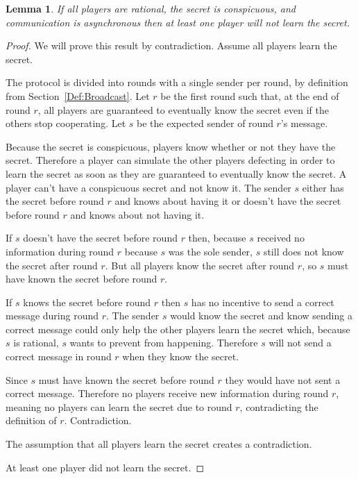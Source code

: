\documentclass{dalcsthesis}
\newtheorem{lemma}{Lemma}
\begin{document}
\begin{lemma}\label{Lem:Async:ConspicuousMustSacrifice}If all players are rational, the secret is conspicuous, and communication is asynchronous then at least one player will not learn the secret.\end{lemma}
\begin{proof}
We will prove this result by contradiction. Assume all players learn the secret.

The protocol is divided into rounds with a single sender per round, by definition from Section~\ref{Def:Broadcast}. Let $r$ be the first round such that, at the end of round $r$, all players are guaranteed to eventually know the secret even if the others stop cooperating. Let $s$ be the expected sender of round $r$'s message.

Because the secret is conspicuous, players know whether or not they have the secret. Therefore a player can simulate the other players defecting in order to learn the secret as soon as they are  guaranteed to eventually know the secret. A player can't have a conspicuous secret and not know it. The sender $s$ either has the secret before round $r$ and knows about having it or doesn't have the secret before round $r$ and knows about not having it.

If $s$ doesn't have the secret before round $r$ then, because $s$ received no information during round $r$ because $s$ was the sole sender, $s$ still does not know the secret after round $r$. But all players know the secret after round $r$, so $s$ must have known the secret before round $r$.

If $s$ knows the secret before round $r$ then $s$ has no incentive to send a correct message during round $r$. The sender $s$ would know the secret and know sending a correct message could only help the other players learn the secret which, because $s$ is rational, $s$ wants to prevent from happening. Therefore $s$ will not send a correct message in round $r$ when they know the secret.

Since $s$ must have known the secret before round $r$ they would have not sent a correct message. Therefore no players receive new information during round $r$, meaning no players can learn the secret due to round $r$, contradicting the definition of $r$. Contradiction.

The assumption that all players learn the secret creates a contradiction.

At least one player did not learn the secret.
\end{proof}
\end{document}

